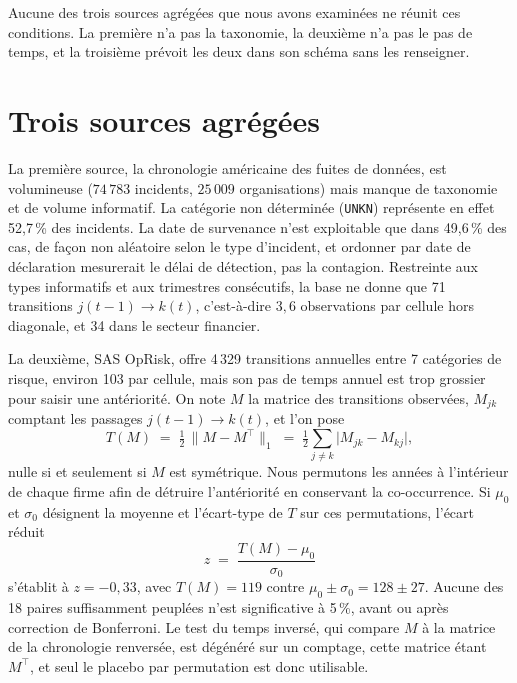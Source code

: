 Aucune des trois sources agrégées que nous avons examinées ne réunit ces conditions. La première n'a
pas la taxonomie, la deuxième n'a pas le pas de temps, et la troisième prévoit les deux dans son
schéma sans les renseigner.

\section{Trois sources agrégées}

La première source, la chronologie américaine des fuites de données, est volumineuse
($74\,783$ incidents, $25\,009$ organisations) mais manque de taxonomie et de volume informatif. La
catégorie non déterminée (\texttt{UNKN}) représente en effet 52,7\,\% des incidents. La date de
survenance n'est exploitable que dans 49,6\,\% des cas, de façon non aléatoire selon le type
d'incident, et ordonner par date de déclaration mesurerait le délai de détection, pas la contagion.
Restreinte aux types informatifs et aux trimestres consécutifs, la base ne donne que 71 transitions
$j(t\!-\!1)\to k(t)$, c'est-à-dire $3{,}6$ observations par cellule hors diagonale, et 34 dans le
secteur financier.

La deuxième, SAS OpRisk, offre 4\,329 transitions annuelles entre 7 catégories de risque, environ 103
par cellule, mais son pas de temps annuel est trop grossier pour saisir une antériorité. On note $M$
la matrice des transitions observées, $M_{jk}$ comptant les passages $j(t-1)\to k(t)$, et l'on pose
\begin{equation}
  T(M) \;=\; \tfrac{1}{2}\,\lVert M - M^{\top}\rVert_1
        \;=\; \tfrac{1}{2}\sum_{j\neq k}\bigl|M_{jk}-M_{kj}\bigr| ,
  \label{eq:asymetrie}
\end{equation}
nulle si et seulement si $M$ est symétrique. Nous permutons les années à l'intérieur de chaque firme
afin de détruire l'antériorité en conservant la co-occurrence. Si $\mu_0$ et $\sigma_0$ désignent la
moyenne et l'écart-type de $T$ sur ces permutations, l'écart réduit
\begin{equation}
  z \;=\; \frac{T(M)-\mu_0}{\sigma_0}
  \label{eq:placebo-z}
\end{equation}
s'établit à $z = -0{,}33$, avec $T(M) = 119$ contre $\mu_0 \pm \sigma_0 = 128 \pm 27$. Aucune des 18
paires suffisamment peuplées n'est significative à 5\,\%, avant ou après correction de Bonferroni. Le
test du temps inversé, qui compare $M$ à la matrice de la chronologie renversée, est dégénéré sur un
comptage, cette matrice étant $M^\top$, et seul le placebo par permutation est donc utilisable.

